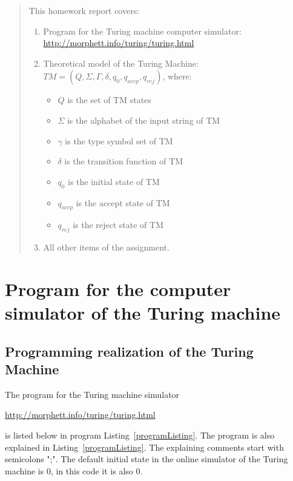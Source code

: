 \documentclass[12pt, a4paper]{report}
\begin{document}
\newpage
\markboth{}{}
\vspace{-15cm}
\begin{abstract}
	This homework report covers:
	\begin{enumerate}
		\item Program for the Turing machine computer simulator: \url{http://morphett.info/turing/turing.html}
		\item Theoretical model of the Turing Machine: $ TM = (Q, \Sigma, \Gamma, \delta, q_{0}, q_{accp}, q_{rej}) $, 
		where: 
			\begin{itemize}
				\item $Q$  is the set of TM states
				\item $\Sigma$  is the alphabet of the input string of TM
				\item $\gamma$  is the type symbol set of TM
				\item $\delta$  is the transition function of TM
				\item $q_{0}$ is the initial state of TM
				\item $q_{accp}$ is the accept state of TM
				\item $q_{rej}$  is the reject state of TM
				\end{itemize}
		\item All other items of the assignment.
		\end{enumerate}

	\end{abstract}
\newpage

\tableofcontents
{}


\newpage
\chapter{Program for the computer simulator of the Turing machine}
\section[]{Programming realization of the Turing Machine}

The program for the Turing machine simulator \cite{TuringSite} \vspace{-0.25cm}
{\center \url{http://morphett.info/turing/turing.html} \par}
\noindent
is listed below in program Listing~\ref{programListing}.
The program is also explained in Listing~\ref{programListing}. The explaining comments start with semicolons ";".
The default initial state in the online simulator of the Turing machine \cite{TuringSite} is $ 0 $, in this code it is also $ 0 $.
\end{document}
